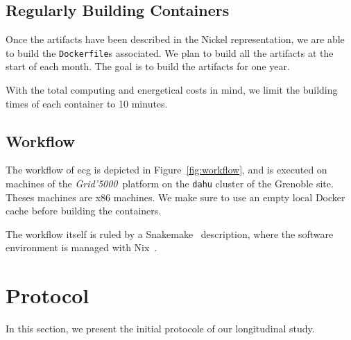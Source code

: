 \documentclass[sigconf,natbib=false]{acmart}
\newcommand{\grid}{\emph{Grid'5000}}
\newcommand{\df}{\texttt{Dockerfile}}
\newcommand{\ecg}{\texttt{ecg}}
\newcommand{\todo}[1]{{\color{red}{TODO: #1}}}
\begin{document}
\subsection{Regularly Building Containers}

Once the artifacts have been described in the Nickel representation, we are able to build the \df s associated.
We plan to build all the artifacts at the start of each month.
The goal is to build the artifacts for one year.

\todo{building patterns, exponential decay}


With the total computing and energetical costs in mind, we limit the building times of each container to 10 minutes.


\subsection{Workflow}\label{sec:workflow}

\begin{figure*}
  \centering
  \caption{
    Workflow of \ecg.
    Each description of an artifact is verified with the Nickel contract and then converted in a JSON representation.
    This JSON representation is then read by \ecg\ to
    \textit{(i)} download the artifact,
    \textit{(ii)} compute the hash of its content,
    \textit{(iii)} build the container from the \df, and
    \textit{(iv)} extract the software environment information from the built container.
    \ecg\ outputs files containing the information about the artifact and its \df\ .
  }
  \label{fig:workflow}
\end{figure*}

The workflow of ecg is depicted in Figure~\ref{fig:workflow}, and is executed on machines of the \grid\ platform \cite{grid5000} on the \texttt{dahu} cluster of the Grenoble site.
Theses machines are x86 machines.
We make sure to use an empty local Docker cache before building the containers.

The workflow itself is ruled by a Snakemake~\cite{koster2012snakemake} description, where the software environment is managed with Nix~\cite{dolstra_nix_2004}.


\section{Protocol}\label{sec:protocol}

In this section, we present the initial protocole of our longitudinal study.
\end{document}
